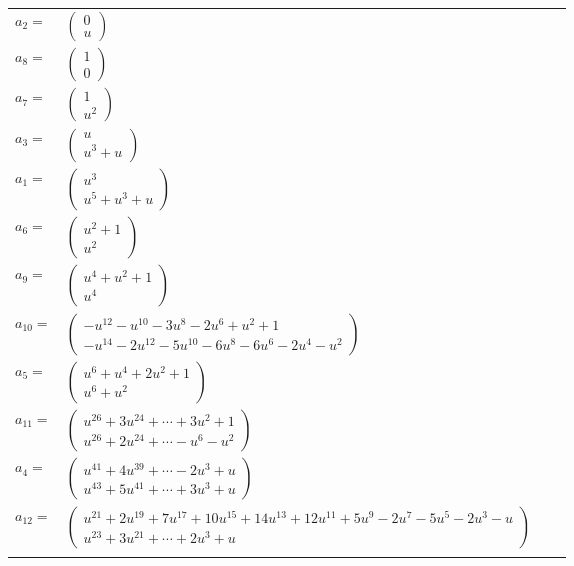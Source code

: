 \documentclass[1p]{elsarticle_modified}
\theoremstyle{definition}
\begin{document}
\begin{tabular}{m{7pt} m{180pt} m{7pt} m{180pt} }
\flushright $a_{2}=$&$\begin{pmatrix}0\\u\end{pmatrix}$ \\
\flushright $a_{8}=$&$\begin{pmatrix}1\\0\end{pmatrix}$ \\
\flushright $a_{7}=$&$\begin{pmatrix}1\\u^2\end{pmatrix}$ \\
\flushright $a_{3}=$&$\begin{pmatrix}u\\u^3+u\end{pmatrix}$ \\
\flushright $a_{1}=$&$\begin{pmatrix}u^3\\u^5+u^3+u\end{pmatrix}$ \\
\flushright $a_{6}=$&$\begin{pmatrix}u^2+1\\u^2\end{pmatrix}$ \\
\flushright $a_{9}=$&$\begin{pmatrix}u^4+u^2+1\\u^4\end{pmatrix}$ \\
\flushright $a_{10}=$&$\begin{pmatrix}- u^{12}- u^{10}-3 u^8-2 u^6+u^2+1\\- u^{14}-2 u^{12}-5 u^{10}-6 u^8-6 u^6-2 u^4- u^2\end{pmatrix}$ \\
\flushright $a_{5}=$&$\begin{pmatrix}u^6+u^4+2 u^2+1\\u^6+u^2\end{pmatrix}$ \\
\flushright $a_{11}=$&$\begin{pmatrix}u^{26}+3 u^{24}+\cdots+3 u^2+1\\u^{26}+2 u^{24}+\cdots- u^6- u^2\end{pmatrix}$ \\
\flushright $a_{4}=$&$\begin{pmatrix}u^{41}+4 u^{39}+\cdots-2 u^3+u\\u^{43}+5 u^{41}+\cdots+3 u^3+u\end{pmatrix}$ \\
\flushright $a_{12}=$&$\begin{pmatrix}u^{21}+2 u^{19}+7 u^{17}+10 u^{15}+14 u^{13}+12 u^{11}+5 u^9-2 u^7-5 u^5-2 u^3- u\\u^{23}+3 u^{21}+\cdots+2 u^3+u\end{pmatrix}$\\&\end{tabular}
\end{document}
